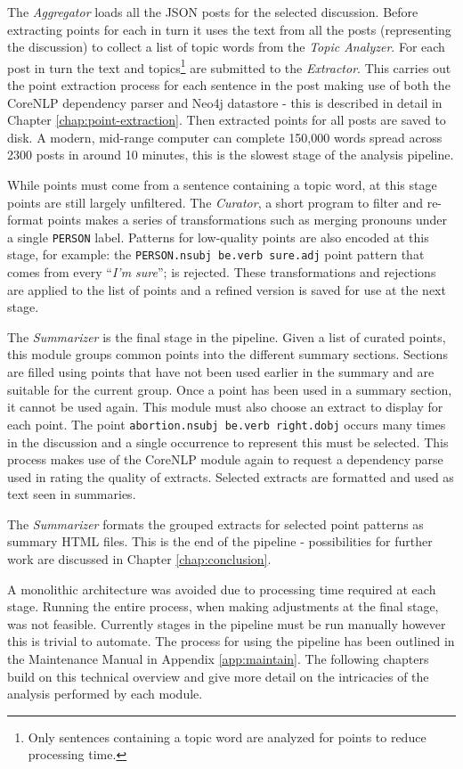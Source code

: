   The \textit{Aggregator} loads all the JSON posts for the selected discussion. Before extracting points for each in turn it uses the text from all the posts (representing the discussion) to collect a list of topic words from the \textit{Topic Analyzer}. For each post in turn the text and topics\footnote{Only sentences containing a topic word are analyzed for points to reduce processing time.} are submitted to the \textit{Extractor}. This carries out the point extraction process for each sentence in the post making use of both the CoreNLP dependency parser and Neo4j datastore - this is described in detail in Chapter \ref{chap:point-extraction}. Then extracted points for all posts are saved to disk. A modern, mid-range computer can complete 150,000 words spread across 2300 posts in around 10 minutes, this is the slowest stage of the analysis pipeline.

  While points must come from a sentence containing a topic word, at this stage points are still largely unfiltered. The \textit{Curator}, a short program to filter and re-format points makes a series of transformations such as merging pronouns under a single \texttt{PERSON} label. Patterns for low-quality points are also encoded at this stage, for example: the \texttt{PERSON.nsubj be.verb sure.adj} point pattern that comes from every ``\textit{I'm sure}''; is rejected. These transformations and rejections are applied to the list of points and a refined version is saved for use at the next stage.

  The \textit{Summarizer} is the final stage in the pipeline. Given a list of curated points, this module groups common points into the different summary sections. Sections are filled using points that have not been used earlier in the summary and are suitable for the current group. Once a point has been used in a summary section, it cannot be used again. This module must also choose an extract to display for each point. The point \texttt{abortion.nsubj be.verb right.dobj} occurs many times in the discussion and a single occurrence to represent this must be selected. This process makes use of the CoreNLP module again to request a dependency parse used in rating the quality of extracts. Selected extracts are formatted and used as text seen in summaries.

  The \textit{Summarizer} formats the grouped extracts for selected point patterns as summary HTML files. This is the end of the pipeline - possibilities for further work are discussed in Chapter \ref{chap:conclusion}.

  A monolithic architecture was avoided due to processing time required at each stage. Running the entire process, when making adjustments at the final stage, was not feasible. Currently stages in the pipeline must be run manually however this is trivial to automate. The process for using the pipeline has been outlined in the Maintenance Manual in Appendix \ref{app:maintain}. The following chapters build on this technical overview and give more detail on the intricacies of the analysis performed by each module.
